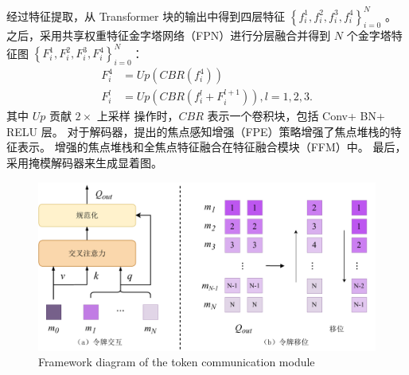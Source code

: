 经过特征提取，从 Transformer 块的输出中得到四层特征 
$\left \{ f_{i}^{1},f_{i}^{2},f_{i}^{3},f_{i}^{4} \right \}_{i=0}^{N}$ 。 
之后，采用共享权重特征金字塔网络（FPN）进行分层融合并得到 $N$ 个金字塔特征图	$ \left \{F_{i}^{1},F_{i}^{2},F_{i}^{3},F_{i}^{4} \right \}_{i=0}^{N}$：
\begin{equation}
	\begin{aligned}
		F_{i}^{4} &= Up \left ( CBR \left ( f_{i}^{4} \right )\right ) \\ 
		F_{i}^{l} &= Up \left ( CBR \left ( f_{i}^{l} + F_{i}^{l+1} \right )  \right ),l=1,2,3  .
	\end{aligned}
\end{equation}
其中 $Up$ 贡献 $2 \times $ 上采样 操作时，$CBR$ 表示一个卷积块，包括 Conv+ BN+ RELU 层。 对于解码器，提出的焦点感知增强（FPE）策略增强了焦点堆栈的特征表示。 增强的焦点堆栈和全焦点特征融合在特征融合模块（FFM）中。 最后，采用掩模解码器来生成显着图。




















\begin{figure}[!ht]
	\centering
	\includegraphics[width=0.95\linewidth]{figures/chapter3/token-interaction.drawio}
	{Framework diagram of the token communication module}
	\label{cpt3_fig1:token_interaction}
\end{figure}



